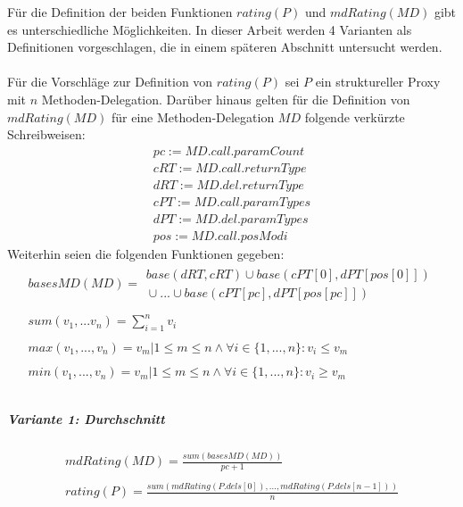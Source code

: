 \documentclass[a4paper,12pt]{article}
\begin{document}
Für die Definition der beiden Funktionen $\mathit{rating(P)}$ und $\mathit{mdRating(MD)}$ gibt es unterschiedliche Möglichkeiten. In dieser Arbeit werden 4 Varianten als Definitionen vorgeschlagen, die in einem späteren Abschnitt untersucht werden.\\\\
Für die Vorschläge zur Definition von $\mathit{rating(P)}$ sei $P$ ein struktureller Proxy mit $n$ Methoden-Delegation.
Darüber hinaus gelten für die Definition von $\mathit{mdRating(MD)}$ für eine Methoden-Delegation $\mathit{MD}$ folgende verkürzte Schreibweisen:
\begin{gather*}
	\mathit{pc} := \mathit{MD.call.paramCount}
	\\
	\mathit{cRT} := \mathit{MD.call.returnType}
	\\
	\mathit{dRT} := \mathit{MD.del.returnType}
	\\
	\mathit{cPT} := \mathit{MD.call.paramTypes}
	\\
	\mathit{dPT} := \mathit{MD.del.paramTypes}
	\\
	\mathit{pos} := \mathit{MD.call.posModi}
\end{gather*}
Weiterhin seien die folgenden Funktionen gegeben:
\begin{gather*}
\mathit{basesMD(MD)} =  
				\begin{array}{l}
					  \mathit{base(dRT, cRT)} \mathit{ }\cup \mathit{base(cPT[0],dPT[pos[0]])} \\
					  \mathit{ }\cup ... \cup \mathit{base(cPT[pc],dPT[pos[pc]])}
				\end{array}    
				\\\\
				\mathit{sum(v_1,...v_n)} = \sum_{i=1}^{n}v_i
\\\\         
\mathit{max(v_1,...,v_n)} = v_{m}| 1 \leq m \leq n  \wedge \forall i \in  \{1,...,n\}: v_i \leq v_{m}
\\\\       
\mathit{min(v_1,...,v_n)} = v_{m}| 1 \leq m \leq n  \wedge \forall i \in  \{1,...,n\}: v_i \geq v_{m}
\\\\    
\end{gather*}



\subparagraph{Variante 1: Durchschnitt}

\begin{gather*}
\mathit{mdRating(MD)} = \frac{\mathit{sum(basesMD(MD))}}{\mathit{pc} + 1}
\\\\
\mathit{rating(P)} = \frac{ \mathit{sum(mdRating(P.dels[0]),...,mdRating(P.dels[n-1]))}}{n}
\end{gather*}
\end{document}
